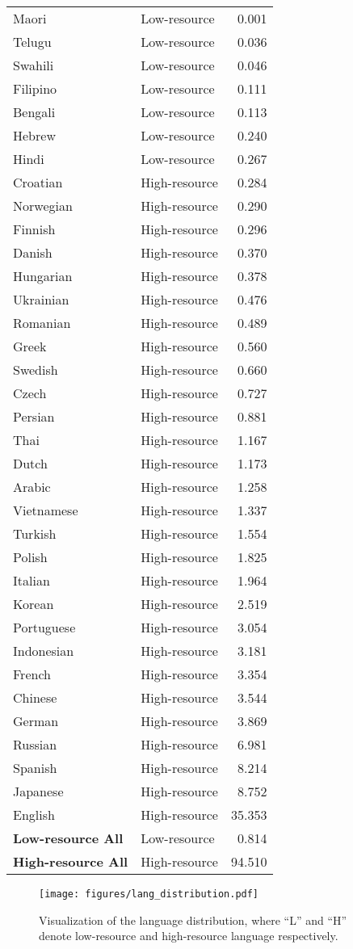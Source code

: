{\begin{longtable}{l|l|r}
Maori & Low-resource & 0.001 \\
Telugu & Low-resource & 0.036 \\
Swahili & Low-resource & 0.046 \\
Filipino & Low-resource & 0.111 \\
Bengali & Low-resource & 0.113 \\
Hebrew & Low-resource & 0.240 \\
Hindi & Low-resource & 0.267 \\
Croatian & High-resource & 0.284 \\
Norwegian & High-resource & 0.290 \\
Finnish & High-resource & 0.296 \\
Danish & High-resource & 0.370 \\
Hungarian & High-resource & 0.378 \\
Ukrainian & High-resource & 0.476 \\
Romanian & High-resource & 0.489 \\
Greek & High-resource & 0.560 \\
Swedish & High-resource & 0.660 \\
Czech & High-resource & 0.727 \\
Persian & High-resource & 0.881 \\
Thai & High-resource & 1.167 \\
Dutch & High-resource & 1.173 \\
Arabic & High-resource & 1.258 \\
Vietnamese & High-resource & 1.337 \\
Turkish & High-resource & 1.554 \\
Polish & High-resource & 1.825 \\
Italian & High-resource & 1.964 \\
Korean & High-resource & 2.519 \\
Portuguese & High-resource & 3.054 \\
Indonesian & High-resource & 3.181 \\
French & High-resource & 3.354 \\
Chinese & High-resource & 3.544 \\
German & High-resource & 3.869 \\
Russian & High-resource & 6.981 \\
Spanish & High-resource & 8.214 \\
Japanese & High-resource & 8.752 \\
English & High-resource & 35.353 \\
\textbf{Low-resource All} & Low-resource & 0.814 \\
\textbf{High-resource All} & High-resource & 94.510 \\

\end{longtable}
}

\begin{figure}[h]
    \centering
    \texttt{[image: figures/lang\_distribution.pdf]}
    \caption{Visualization of the language distribution, where ``L'' and ``H'' denote low-resource and high-resource language respectively.}
    \label{fig:lang_distribution}
\end{figure}